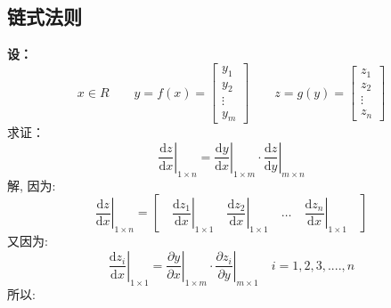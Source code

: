 \documentclass[withoutpreface,bwprint]{cumcmthesis} %
\begin{document}
	\subsection{链式法则}
	\par \textbf{设：}
	\begin{equation*}
		x \in R 
		\quad \quad
		 y=f(x)=\left[
			\begin{array}{c}
				y_1\\
				y_2\\
				\vdots\\
				y_m
			\end{array}\right]
		\quad \quad
		z=g(y)=\left[\begin{array}{c}
		z_1\\
		z_2\\
		\vdots\\
		z_n
	\end{array}
		\right]
	\end{equation*}
	求证：
	\begin{equation}	
		\left.\dfrac{\mathrm{d} z}{\mathrm{d} x}\right|_{1{\times}n}=\left.\dfrac{\mathrm{d} y}{\mathrm{d} x}\right|_{1{\times}m}\cdot  \left.\dfrac{\mathrm{d} z}{\mathrm{d} y}\right|_{m{\times}n}
		\label{con:inventoryflow1}
	\end{equation}
	解,
	因为:
	\begin{equation}
		\left.\dfrac{\mathrm{d} z}{\mathrm{d} x}\right|_{1{\times}n}=\left[
		\quad
			\left.\dfrac{\mathrm{d} z_1}{\mathrm{d} x}\right|_{1{\times}1} \quad \left.\dfrac{\mathrm{d} z_2}{\mathrm{d} x}\right|_{1{\times}1} \quad \ldots \quad \left.\dfrac{\mathrm{d} z_n}{\mathrm{d} x}\right|_{1{\times}1}
			\quad
		\right]
	\end{equation}
	又因为:
	\begin{equation}
		\left.\dfrac{\mathrm{d} z_i}{\mathrm{d} x}\right|_{1{\times}1}
		=
		\left.\dfrac{\partial y}{\partial  x}\right|_{1{\times}m} \cdot \left.\dfrac{\partial z_i}{\partial y}\right|_{m{\times}1} \quad i=1,2,3,....,n
	\end{equation}
	所以:
\end{document}
